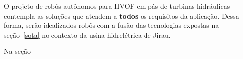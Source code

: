 O projeto de robôs autônomos para HVOF em pás de turbinas hidráulicas contempla
as soluções que atendem a \textbf{todos} os requisitos da aplicação. Dessa
forma, serão idealizados robôs com a fusão das tecnologias expostas na
seção~\ref{sota} no contexto da usina hidrelétrica de Jirau. 

Na seção 
